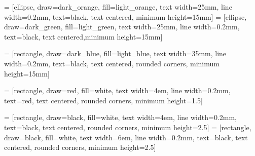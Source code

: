 \documentclass[a4paper,12pt]{article}
\begin{document}
\pagestyle{empty}


 = [ellipse, draw=dark_orange, fill=light_orange, text width=25mm, line width=0.2mm, text=black, text centered, minimum height=15mm]
 = [ellipse, draw=dark_green, fill=light_green, text width=25mm, line width=0.2mm, text=black, text centered,minimum height=15mm]


 = [rectangle, draw=dark_blue, fill=light_blue, text width=35mm, line width=0.2mm, text=black, text centered, rounded corners, minimum height=15mm]

 = [rectangle, draw=red, fill=white, text width=4em, line width=0.2mm, text=red, text centered,  rounded corners, minimum height=1.5]

 = [rectangle, draw=black, fill=white, text width=4em, line width=0.2mm, text=black, text centered,  rounded corners, minimum height=2.5]
 = [rectangle, draw=black, fill=white, text width=6em, line width=0.2mm, text=black, text centered,  rounded corners, minimum height=2.5]
\end{document}
